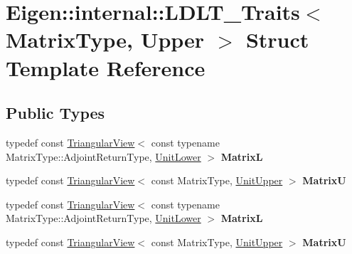 \hypertarget{struct_eigen_1_1internal_1_1_l_d_l_t___traits_3_01_matrix_type_00_01_upper_01_4}{}\section{Eigen\+:\+:internal\+:\+:L\+D\+L\+T\+\_\+\+Traits$<$ Matrix\+Type, Upper $>$ Struct Template Reference}
\label{struct_eigen_1_1internal_1_1_l_d_l_t___traits_3_01_matrix_type_00_01_upper_01_4}
\subsection*{Public Types}
\begin{DoxyCompactItemize}
\item 
\mbox{\label{struct_eigen_1_1internal_1_1_l_d_l_t___traits_3_01_matrix_type_00_01_upper_01_4_a5b31eeee78528ca777ba86b1a4aab2fb}} 
typedef const \hyperlink{group___core___module_class_eigen_1_1_triangular_view}{Triangular\+View}$<$ const typename Matrix\+Type\+::\+Adjoint\+Return\+Type, \hyperlink{group__enums_gga39e3366ff5554d731e7dc8bb642f83cda8155cfdfde9e75e7144dff0393d17181}{Unit\+Lower} $>$ {\bfseries MatrixL}
\item 
\mbox{\label{struct_eigen_1_1internal_1_1_l_d_l_t___traits_3_01_matrix_type_00_01_upper_01_4_a97716be1cddf0883c9a3af1779ce7139}} 
typedef const \hyperlink{group___core___module_class_eigen_1_1_triangular_view}{Triangular\+View}$<$ const Matrix\+Type, \hyperlink{group__enums_gga39e3366ff5554d731e7dc8bb642f83cda8b0b63ff46dcd7377b59df14e0562fc1}{Unit\+Upper} $>$ {\bfseries MatrixU}
\item 
\mbox{\label{struct_eigen_1_1internal_1_1_l_d_l_t___traits_3_01_matrix_type_00_01_upper_01_4_a5b31eeee78528ca777ba86b1a4aab2fb}} 
typedef const \hyperlink{group___core___module_class_eigen_1_1_triangular_view}{Triangular\+View}$<$ const typename Matrix\+Type\+::\+Adjoint\+Return\+Type, \hyperlink{group__enums_gga39e3366ff5554d731e7dc8bb642f83cda8155cfdfde9e75e7144dff0393d17181}{Unit\+Lower} $>$ {\bfseries MatrixL}
\item 
\mbox{\label{struct_eigen_1_1internal_1_1_l_d_l_t___traits_3_01_matrix_type_00_01_upper_01_4_a97716be1cddf0883c9a3af1779ce7139}} 
typedef const \hyperlink{group___core___module_class_eigen_1_1_triangular_view}{Triangular\+View}$<$ const Matrix\+Type, \hyperlink{group__enums_gga39e3366ff5554d731e7dc8bb642f83cda8b0b63ff46dcd7377b59df14e0562fc1}{Unit\+Upper} $>$ {\bfseries MatrixU}
\end{DoxyCompactItemize}
